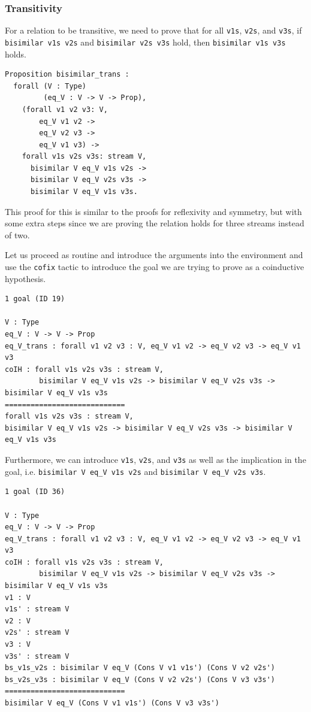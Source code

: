 \documentclass{article}
\begin{document}
\subsubsection{Transitivity}

For a relation to be transitive, we need to prove that for all \texttt{v1s}, \texttt{v2s}, and \texttt{v3s}, if \texttt{bisimilar v1s v2s} and \texttt{bisimilar v2s v3s} hold, then \texttt{bisimilar v1s v3s} holds.

\begin{lstlisting}
Proposition bisimilar_trans :
  forall (V : Type)
         (eq_V : V -> V -> Prop),
    (forall v1 v2 v3: V,
        eq_V v1 v2 ->
        eq_V v2 v3 ->
        eq_V v1 v3) ->
    forall v1s v2s v3s: stream V,
      bisimilar V eq_V v1s v2s ->
      bisimilar V eq_V v2s v3s ->
      bisimilar V eq_V v1s v3s.
\end{lstlisting}

This proof for this is similar to the proofs for reflexivity and symmetry, but with some extra steps since we are proving the relation holds for three streams instead of two.

Let us proceed as routine and introduce the arguments into the environment and use the \texttt{cofix} tactic to introduce the goal we are trying to prove as a coinductive hypothesis.

\begin{lstlisting}
1 goal (ID 19)

V : Type
eq_V : V -> V -> Prop
eq_V_trans : forall v1 v2 v3 : V, eq_V v1 v2 -> eq_V v2 v3 -> eq_V v1 v3
coIH : forall v1s v2s v3s : stream V,
        bisimilar V eq_V v1s v2s -> bisimilar V eq_V v2s v3s -> bisimilar V eq_V v1s v3s
============================
forall v1s v2s v3s : stream V,
bisimilar V eq_V v1s v2s -> bisimilar V eq_V v2s v3s -> bisimilar V eq_V v1s v3s
\end{lstlisting}

Furthermore, we can introduce \texttt{v1s}, \texttt{v2s}, and \texttt{v3s} as well as the implication in the goal, i.e. \texttt{bisimilar V eq\_V v1s v2s} and \texttt{bisimilar V eq\_V v2s v3s}.

\begin{lstlisting}
1 goal (ID 36)

V : Type
eq_V : V -> V -> Prop
eq_V_trans : forall v1 v2 v3 : V, eq_V v1 v2 -> eq_V v2 v3 -> eq_V v1 v3
coIH : forall v1s v2s v3s : stream V,
        bisimilar V eq_V v1s v2s -> bisimilar V eq_V v2s v3s -> bisimilar V eq_V v1s v3s
v1 : V
v1s' : stream V
v2 : V
v2s' : stream V
v3 : V
v3s' : stream V
bs_v1s_v2s : bisimilar V eq_V (Cons V v1 v1s') (Cons V v2 v2s')
bs_v2s_v3s : bisimilar V eq_V (Cons V v2 v2s') (Cons V v3 v3s')
============================
bisimilar V eq_V (Cons V v1 v1s') (Cons V v3 v3s')
\end{lstlisting}
\end{document}
